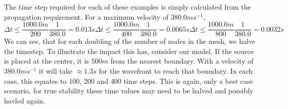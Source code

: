 The time step required for each of these examples is simply calculated from
the propagation requirement. For a maximum velocity of $380.0ms^{-1}$,
\begin{subequations}
 \begin{equation}
  \Delta t \leq \frac{1000.0m}{200} \frac{1}{380.0} = 0.013s
 \end{equation}
 \begin{equation}
  \Delta t \leq \frac{1000.0m}{400} \frac{1}{380.0} = 0.0065s
 \end{equation}
 \begin{equation}
  \Delta t \leq \frac{1000.0m}{800} \frac{1}{380.0} = 0.0032s
 \end{equation}
\end{subequations}
We can see, that for each doubling of the number of nodes in the mesh, we halve
the timestep. To illustrate the impact this has, consider our model. If the
source is placed at the center, it is $500m$ from the nearest boundary. With a
velocity of $380.0ms^{-1}$ it will take $\approx1.3s$ for the wavefront to
reach that boundary. In each case, this equates to $100$,  $200$ and $400$ time
steps. This is again, only a best case scenario, for true stability these time
values may need to be halved and possibly havled again.

